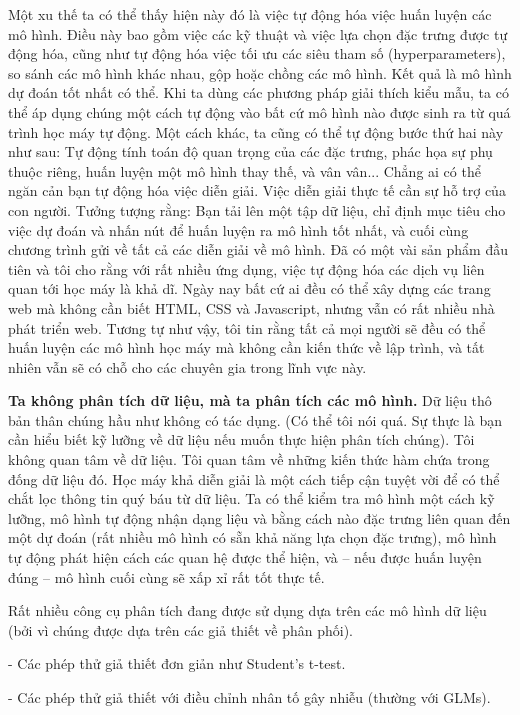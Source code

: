Một xu thế ta có thể thấy hiện này đó là việc tự động hóa việc huấn luyện các mô hình. Điều này bao gồm việc các kỹ thuật và việc lựa chọn đặc trưng được tự động hóa, cũng như tự động hóa việc tối ưu các siêu tham số (hyperparameters), so sánh các mô hình khác nhau, gộp hoặc chồng các mô hình. Kết quả là mô hình dự đoán tốt nhất có thể. Khi ta dùng các phương pháp giải thích kiểu mẫu, ta có thể áp dụng chúng một cách tự động vào bất cứ mô hình nào được sinh ra từ quá trình học máy tự động. Một cách khác, ta cũng có thể tự động bước thứ hai này như sau: Tự động tính toán độ quan trọng của các đặc trưng, phác họa sự phụ thuộc riêng, huấn luyện một mô hình thay thế, và vân vân... Chẳng ai có thể ngăn cản bạn tự động hóa việc diễn giải. Việc diễn giải thực tế cần sự hỗ trợ của con người. Tưởng tượng rằng: Bạn tải lên một tập dữ liệu, chỉ định mục tiêu cho việc dự đoán và nhấn nút để huấn luyện ra mô hình tốt nhất, và cuối cùng chương trình gửi về tất cả các diễn giải về mô hình. 
Đã có một vài sản phẩm đầu tiên và tôi cho rằng với rất nhiều ứng dụng, việc tự động hóa các dịch vụ liên quan tới học máy là khả dĩ. Ngày nay bất cứ ai đều có thể xây dựng các trang web mà không cần biết HTML, CSS và Javascript, nhưng vẫn có rất nhiều nhà phát triển web. Tương tự như vậy, tôi tin rằng tất cả mọi người sẽ đều có thể huấn luyện các mô hình học máy mà không cần kiến thức về lập trình, và tất nhiên vẫn sẽ có chỗ cho các chuyên gia trong lĩnh vực này.

\textbf{Ta không phân tích dữ liệu, mà ta phân tích các mô hình.}
Dữ liệu thô bản thân chúng hầu như không có tác dụng. (Có thể tôi nói quá. Sự thực là bạn cần hiểu biết kỹ lưỡng về dữ liệu nếu muốn thực hiện phân tích chúng). Tôi không quan tâm về dữ liệu. Tôi quan tâm về những kiến thức hàm chứa trong đống dữ liệu đó. Học máy khả diễn giải là một cách tiếp cận tuyệt vời để có thể chắt lọc thông tin quý báu từ dữ liệu. Ta có thể kiểm tra mô hình một cách kỹ lưỡng, mô hình tự động nhận dạng liệu và bằng cách nào đặc trưng liên quan đến một dự đoán (rất nhiều mô hình có sẵn khả năng lựa chọn đặc trưng), mô hình tự động phát hiện cách các quan hệ được thể hiện, và -- nếu được huấn luyện đúng -- mô hình cuối cùng sẽ xấp xỉ rất tốt thực tế.

Rất nhiều công cụ phân tích đang được sử dụng dựa trên các mô hình dữ liệu (bởi vì chúng được dựa trên các giả thiết về phân phối).

- Các phép thử giả thiết đơn giản như Student's t-test.

- Các phép thử giả thiết với điều chỉnh nhân tố gây nhiễu (thường với GLMs).

